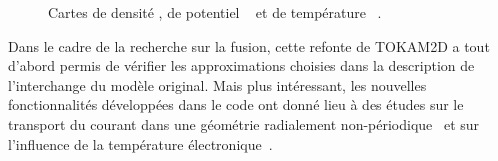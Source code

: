 \begin{refsection}
 \begin{figure}[!htbp]
    \centering
    \caption{Cartes de densité , de potentiel
    ~ et de température
    ~.}
    \label{2-MagColumnWithTe}
	\end{figure}

Dans le cadre de la recherche sur la fusion, cette refonte de TOKAM2D a tout
d'abord permis de vérifier les approximations choisies dans la description de
l'interchange du modèle original. Mais plus intéressant, les nouvelles
fonctionnalités développées dans le code ont donné lieu à des études sur
le transport du courant dans une géométrie radialement
non-périodique~\parencite{Futtersack} et sur l'influence de la température
électronique~\parencite{Moulton}.


\end{refsection}
